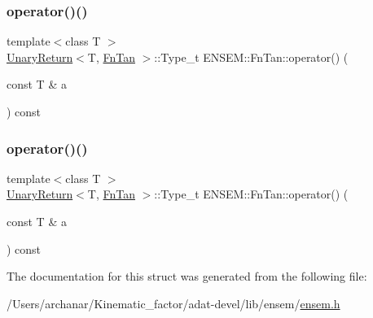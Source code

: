\mbox{\label{structENSEM_1_1FnTan_ac94aaabe2436b8699faf802a7365e342}} 
\subsubsection{\texorpdfstring{operator()()}{operator()()}\hspace{0.1cm}{\footnotesize\ttfamily [2/3]}}
{\footnotesize\ttfamily template$<$class T $>$ \\
\mbox{\hyperlink{structENSEM_1_1UnaryReturn}{Unary\+Return}}$<$T, \mbox{\hyperlink{structENSEM_1_1FnTan}{Fn\+Tan}} $>$\+::Type\+\_\+t E\+N\+S\+E\+M\+::\+Fn\+Tan\+::operator() (\begin{DoxyParamCaption}\item[{const T \&}]{a }\end{DoxyParamCaption}) const\hspace{0.3cm}{\ttfamily [inline]}}

\mbox{\label{structENSEM_1_1FnTan_ac94aaabe2436b8699faf802a7365e342}} 
\subsubsection{\texorpdfstring{operator()()}{operator()()}\hspace{0.1cm}{\footnotesize\ttfamily [3/3]}}
{\footnotesize\ttfamily template$<$class T $>$ \\
\mbox{\hyperlink{structENSEM_1_1UnaryReturn}{Unary\+Return}}$<$T, \mbox{\hyperlink{structENSEM_1_1FnTan}{Fn\+Tan}} $>$\+::Type\+\_\+t E\+N\+S\+E\+M\+::\+Fn\+Tan\+::operator() (\begin{DoxyParamCaption}\item[{const T \&}]{a }\end{DoxyParamCaption}) const\hspace{0.3cm}{\ttfamily [inline]}}



The documentation for this struct was generated from the following file\+:\begin{DoxyCompactItemize}
\item 
/\+Users/archanar/\+Kinematic\+\_\+factor/adat-\/devel/lib/ensem/\mbox{\hyperlink{adat-devel_2lib_2ensem_2ensem_8h}{ensem.\+h}}\end{DoxyCompactItemize}
